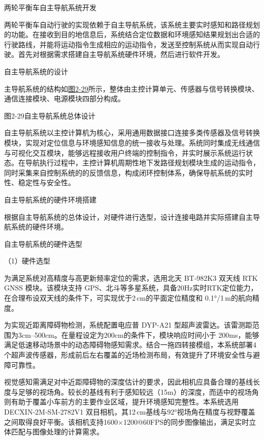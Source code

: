 两轮平衡车自主导航系统开发

两轮平衡车自动行驶的实现依赖于自主导航系统，该系统主要实时感知和路径规划的功能。在接收到目的地信息后，系统结合定位数据和环境感知结果规划出合适的行驶路线，并能将运动指令生成相应的运动指令，发送至控制系统从而实现自动行驶。首先对根据需求搭建自主导航系统硬件环境，然后进行软件开发。

自主导航系统的设计

主导航系统的结构如\hyperref[_Ref201344573]{图2-29}所示，整体由主控计算单元、传感器与信号转换模块、通信连接模块、电源模块四部分构成。



\protect{}\label{_Ref201344573}{}图2-29自主导航系统总体设计

自主导航系统以主控计算机为核心，采用通用数据接口连接多类传感器及信号转换模块，实现对定位信息与环境感知信息的统一接收与处理。系统同时集成无线通信与可视化交互模块，能够远程接收用户终端的控制指令，并实时展示系统运行状态。在导航执行过程中，主控计算机周期性地下发路径规划模块生成的运动指令，同时采集来自控制系统的的反馈信息，构成闭环控制体系，确保导航系统的实时性、稳定性与安全性。

自主导航系统的硬件环境搭建

根据自主导航系统的总体设计，对硬件进行选型，设计连接电路并实际搭建自主导航系统的硬件环境。

自主导航系统的硬件选型

（1）硬件选型

为满足系统对高精度与高更新频率定位的需求，选用北天 BT‑982K3 双天线 RTK
GNSS 模块。该模块支持
GPS、北斗等多星系统，具备20Hz实时RTK定位能力，在合理布设双天线的条件下，可实现优于2\,cm的平面定位精度和
0.1°/1\,m的航向精度。

为实现近距离障碍物检测，系统配置电应普 DYP-A21
型超声波雷达。该雷测距范围为3cm--500cm。在量程设定为200cm的条件下，模块响应时间小于
200ms，能够满足低速移动场景中的动态障碍物感知需求。结合一拖四转接模组，本系统部署4个超声波传感器，形成前后左右覆盖的近场检测布局，有效提升了环境安全性与避障可靠性。

视觉感知需满足对中近距障碍物的深度估计的要求，因此相机应具备合理的基线长度与足够的视场角。较长的基线有利于感知较远（15m）的深度，而适中的视场角则有助于覆盖小车前方的主要作业区域，提升环境感知完整性。本系统选用DECXIN‑2M‑SM‑2782V1
双目相机，其12\,cm基线与92°视场角在精度与视野覆盖之间取得良好平衡。该相机支持1600×1200@60FPS的同步图像输出，满足实时立体匹配与图像处理的计算需求。

